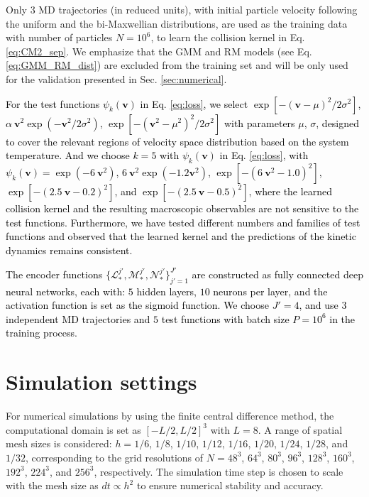 \documentclass[preprint,1p,times]{elsarticle}
\theoremstyle{definition}
\theoremstyle{remark}
\newcommand{\tcb}[1]{\textcolor{black}{#1}}
\newcommand{\tcr}[1]{\textcolor{black}{#1}}
\begin{document}
Only $3$ MD trajectories (in reduced units), with initial particle velocity following the uniform and the bi-Maxwellian distributions, are used as the training data with number of particles $N=10^{6}$, to learn the collision kernel in Eq. \eqref{eq:CM2_sep}. We emphasize that the GMM and RM models (see Eq. \eqref{eq:GMM_RM_dist}) are excluded from the training set and will be only used for the validation presented in Sec. \ref{sec:numerical}.  

\tcr{For the test functions $\psi_k(\boldsymbol{v})$ in Eq. \eqref{eq:loss}, we select $\exp[-(\boldsymbol{v}-\mu)^2/2\sigma^{2}]$, $\alpha~\boldsymbol{v}^2 \exp(-\boldsymbol{v}^2/2\sigma^{2})$, $\exp[-(\boldsymbol{v}^2 - \mu^{2})^2/2\sigma^{2}]$ with parameters $\mu$, $\sigma$, designed to cover the relevant regions of velocity space distribution based on the system temperature.
And we choose $k=5$ with $\psi_k(\boldsymbol{v})$ in Eq. \eqref{eq:loss}, with $\psi_{k}(\boldsymbol{v}) = \exp(-6~\boldsymbol{v}^2)$, $6~\boldsymbol{v}^2 \exp(-1.2\boldsymbol{v}^2)$, $\exp[-(6~\boldsymbol{v}^2 - 1.0)^2]$, $\exp[-(2.5~\boldsymbol{v} - 0.2)^2]$, and $\exp[-(2.5~\boldsymbol{v} - 0.5)^2]$, where the learned collision kernel and the resulting macroscopic observables are not sensitive to the test functions.} 
\tcb{Furthermore, we have tested different numbers and families of test functions and observed that the learned kernel and the predictions of the kinetic dynamics remains consistent.}

\tcr{The encoder functions $\{\mathcal{L}_{\ast}^{j'}, \mathcal{M}_{\ast}^{j'}, \mathcal{N}_{\ast}^{j'}\}_{j'=1}^{J'}$ are constructed as fully connected deep neural networks, each with: $5$ hidden layers, $10$ neurons per layer, and the activation function is set as the sigmoid function.
We choose $J'=4$, and use $3$ independent MD trajectories and $5$ test functions with batch size $P = 10^{6}$ in the training process.}



\section{Simulation settings}
\label{sec:simulation_settings}
For numerical simulations by using the finite central difference method, the computational domain is set as $[-L/2, L/2]^{3}$ with $L=8$.
A range of spatial mesh sizes is considered: $h=1/6$, $1/8$, $1/10$, $1/12$, $1/16$, $1/20$, $1/24$, $1/28$, and $1/32$, corresponding to the grid resolutions of $N=48^{3}$, $64^{3}$, $80^{3}$, $96^{3}$, $128^{3}$, $160^{3}$, $192^{3}$, $224^{3}$, and $256^{3}$, respectively.
The simulation time step is chosen to scale with the mesh size as $dt \propto h^{2}$ to ensure numerical stability and accuracy.
\end{document}
